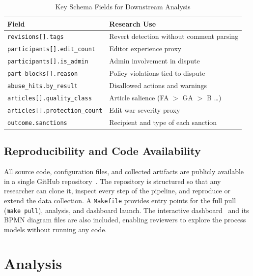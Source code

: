 \documentclass[conference]{IEEEtran}
\begin{document}
\begin{table}[tb]
\caption{Key Schema Fields for Downstream Analysis}
\label{tab:keyfields}
\begin{tabularx}{\columnwidth}{@{}l X@{}}
\toprule
\textbf{Field} & \textbf{Research Use} \\
\midrule
\texttt{revisions[].tags}            & Revert detection without comment parsing \\
\texttt{participants[].edit\_count}   & Editor experience proxy \\
\texttt{participants[].is\_admin}     & Admin involvement in dispute \\
\texttt{part\_blocks[].reason}        & Policy violations tied to dispute \\
\texttt{abuse\_hits.by\_result}        & Disallowed actions and warnings \\
\texttt{articles[].quality\_class}    & Article salience (FA $>$ GA $>$ B \ldots) \\
\texttt{articles[].protection\_count} & Edit war severity proxy \\
\texttt{outcome.sanctions}           & Recipient and type of each sanction \\
\bottomrule
\end{tabularx}
\end{table}

\subsection{Reproducibility and Code Availability}

All source code, configuration files, and collected artifacts are publicly
available in a single GitHub repository~\cite{b_repo}. The repository is
structured so that any researcher can clone it, inspect every step of the
pipeline, and reproduce or extend the data collection. A \texttt{Makefile}
provides entry points for the full pull (\texttt{make pull}), analysis, and
dashboard launch. The interactive dashboard~\cite{b_dashboard} and its
BPMN diagram files are also included, enabling reviewers to explore the
process models without running any code.

\section{Analysis}
\end{document}
